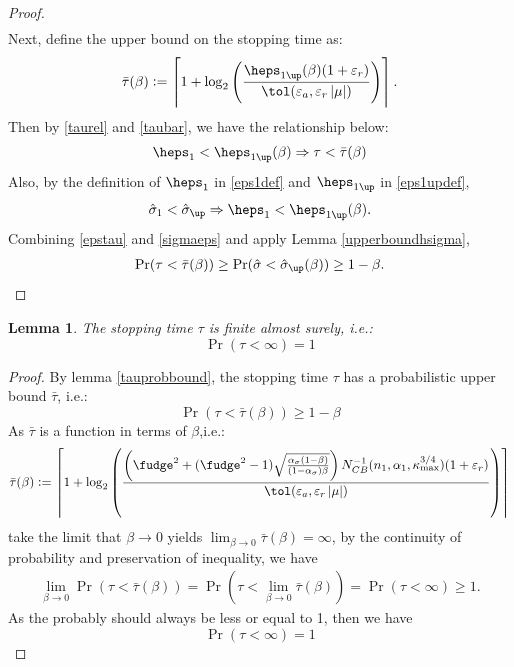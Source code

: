 \documentclass{iitthesis}
\newtheorem{lemma}[theorem]{Lemma}
\begin{document}
\begin{proof}
\begin{align}
\end{align}
Next, define the upper bound on the stopping time as: 
\begin{align}\label{taubarrel}
\bar{\tau}(\beta):= \left \lceil 1+\log_2 \left(\frac{\heps_{1\up}(\beta)(1+\varepsilon_r)}{ \tol(\varepsilon_a,\varepsilon_r \abs{\mu})}\right) \right \rceil.
\end{align}
Then by \eqref{taurel} and \eqref{taubar}, we have the relationship below:
\begin{align} \label{epstau}
 \heps_1 <\heps_{1\up}(\beta) \Rightarrow \tau <\bar{\tau}(\beta)
\end{align}
Also, by the definition of $\heps_1$ in \eqref{eps1def} and $\heps_{1\up}$ in \eqref{eps1updef},
\begin{align}\label{sigmaeps}
 \hsigma_1 < \hsigma_{\up} \Rightarrow \heps_1 < \heps_{1\up}(\beta).
\end{align}
Combining \eqref{epstau} and \eqref{sigmaeps} and apply  Lemma \ref{upperboundhsigma}, 
\begin{align}
\Pr(\tau < \bar{\tau}(\beta)) \geq  \Pr(\hsigma < \hsigma_{\up}(\beta)) \geq 1-\beta.
\end{align}
\end{proof}

\begin{lemma}\label{taufinite}
The stopping time $\tau$ is finite almost surely, i.e.:
$$\Pr(\tau < \infty) = 1$$
\end{lemma}
\begin{proof}
By lemma \ref{tauprobbound}, the stopping time $\tau$ has a probabilistic upper bound $\bar{\tau}$,  i.e.:
$$\Pr(\tau < \bar{\tau}(\beta)) \geq 1-\beta$$
As $\bar{\tau}$ is a function in terms of $\beta$,i.e.:
$$\bar{\tau}(\beta):= \left \lceil 1+\log_2 \left(\frac{\left(\fudge^2+(\fudge^2-1)\sqrt{\frac{\alpha_{\sigma}(1-\beta)}{(1-\alpha_{\sigma})\beta}}\right) N_{CB}^{-1}(n_1,\alpha_1,\kappa_{\max}^{3/4})(1+\varepsilon_r)}{ \tol(\varepsilon_a,\varepsilon_r \abs{\mu})}\right) \right \rceil$$
take the limit that $\beta \to 0$ yields $\lim_{\beta \to 0} \bar{\tau}(\beta) = \infty$, by the continuity of probability and preservation of inequality,  we have
\begin{align}
\lim_{\beta \to 0} \Pr(\tau  <\bar{\tau}(\beta)) = \Pr(\tau  <\lim_{\beta \to 0}\bar{\tau}(\beta)) 
= \Pr(\tau < \infty)  \geq 1.
\end{align}
As the probably should always be less or equal to 1, then we have
$$\Pr(\tau < \infty)  = 1$$
\end{proof}
\end{document}
